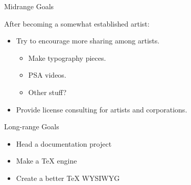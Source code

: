 \documentclass[xcolor=svgnames,handout]{beamer}
\begin{document}
\begin{frame}{Midrange Goals}

After becoming a somewhat established artist:\pause

	\begin{itemize}
		\item{Try to encourage more sharing among artists.}
			\begin{itemize}
				\item{Make typography pieces.}
				\item{PSA videos.}
				\item{Other stuff?}
			\end{itemize}
		\item{Provide license consulting for artists and corporations.}
	\end{itemize}

\end{frame}

\begin{frame}{Long-range Goals}

\begin{itemize}
	\item{Head a documentation project}
	\item{Make a \TeX{} engine}
	\item{Create a better \TeX{} WYSIWYG}
\end{itemize}
\end{frame}


\end{document}
